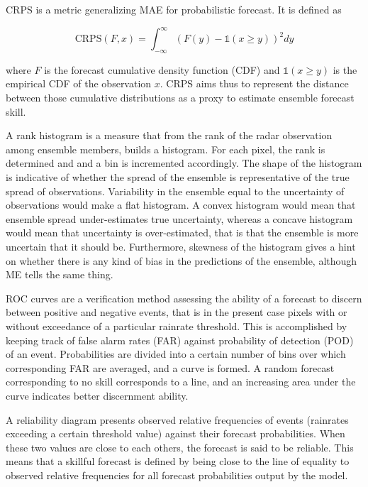 CRPS is a metric generalizing MAE for probabilistic forecast. It is defined as 

\begin{equation}
	\text{CRPS}(F,x) = \int_{-\infty}^{\infty} (F(y) - \mathds{1}(x \geq y))^2 dy
\end{equation}

where $F$ is the forecast cumulative density function (CDF) and $\mathds{1}(x \geq y)$ is the empirical CDF of the observation $x$. CRPS aims thus to represent the distance between those cumulative distributions as a proxy to estimate ensemble forecast skill. 

A rank histogram is a measure that from the rank of the radar observation among ensemble members, builds a histogram. For each pixel, the rank is determined and and a bin is incremented accordingly. The shape of the histogram is indicative of  whether the spread of the ensemble is representative of the true spread of observations. Variability in the ensemble equal to the uncertainty of observations would make a flat histogram. A convex histogram would mean that ensemble spread under-estimates true uncertainty, whereas a concave histogram would mean that uncertainty is over-estimated, that is that the ensemble is more uncertain that it should be. Furthermore, skewness of the histogram gives a hint on whether there is any kind of bias in the predictions of the ensemble, although ME tells the same thing. 


ROC curves are a verification method assessing the ability of a forecast to discern between positive and negative events, that is in the present case pixels with or without exceedance of a particular rainrate threshold. This is accomplished by keeping track of false alarm rates (FAR) against probability of detection (POD) of an event. Probabilities are divided into a certain number of bins over which corresponding FAR are averaged, and a curve is formed. A random forecast corresponding to no skill corresponds to a line, and an increasing area under the curve indicates better discernment ability. 

A reliability diagram presents observed relative frequencies of events (rainrates exceeding a certain threshold value) against their forecast probabilities. When these two values are close to each others, the forecast is said to be reliable. This means that a skillful forecast is defined by being close to the line of equality to observed relative frequencies for all forecast probabilities output by the model. 

